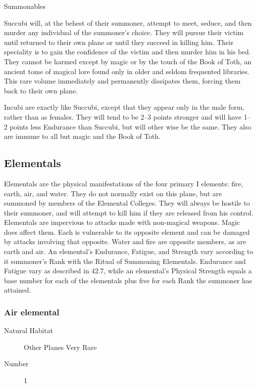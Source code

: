 \begin{mmgroup}{Summonables}
\begin{mmcomment}
Succubi will, at the behest of their summoner, attempt to meet,
seduce, and then murder any individual of the summoner's choice.  They
will pursue their victim until returned to their own plane or until
they succeed in killing him. Their speciality is to gain the
confidence of the victim and then murder him in his bed.  They cannot
be harmed except by magic or by the touch of the Book of Toth, an
ancient tome of magical lore found only in older and seldom frequented
libraries.  This rare volume immediately and permanently dissipates
them, forcing them back to their own plane.

Incubi are exactly like Succubi, except that they appear only in the
male form, rather than as females.  They will tend to be 2--3 points
stronger and will have 1--2 points less Endurance than Succubi, but
will other wise be the same.  They also are immune to all but magic
and the Book of Toth.
\end{mmcomment}
\subsection{Elementals}
Elementals are the physical manifestations of the four primary I
elements: fire, earth, air, and water. They do not normally exist on
this plane, but are summoned by members of the Elemental
Colleges. They will always be hostile to their summoner, and will
attempt to kill him if they are released from his control.  Elementals
are impervious to attacks made with non-magical weapons. Magic does
affect them. Each is vulnerable to its opposite element and can be
damaged by attacks involving that opposite. Water and fire are
opposite members, as are earth and air.  An elemental's Endurance,
Fatigue, and Strength vary according to it summoner's Rank with the
Ritual of Summoning Elementals. Endurance and Fatigue vary as
described in 42.7, while an elemental's Physical Strength equals a
base number for each of the elementals plus five for each Rank the
summoner has attained.

\subsubsection{Air elemental}

\begin{description}
\item[Natural Habitat] Other Planes Very Rare

\item[Number] 1


\end{description}
\end{mmgroup}
